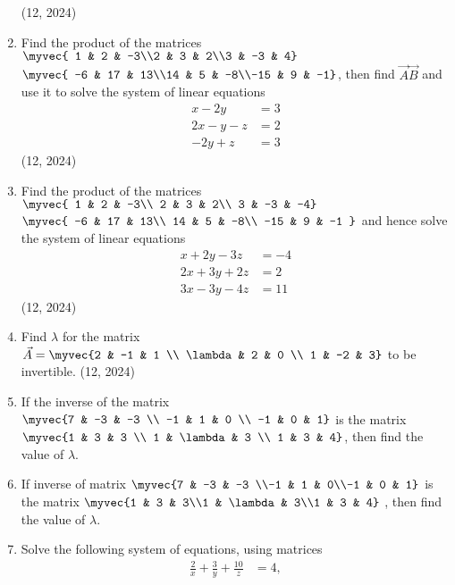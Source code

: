 \begin{enumerate}[label=\thesubsection.\arabic*,ref=\thesubsection.\theenumi]
\hfill (12, 2024)
\item Find the product of the matrices $\myvec{ 1 & 2 & -3\\2 & 3 & 2\\3 & -3 & 4}$ $\myvec{  -6 & 17 & 13\\14 & 5 & -8\\-15 & 9 & -1}$, then find $\vec{A}\vec{B}$ and use it to solve the system of linear equations 
\begin{align*} x - 2y &= 3\\2x - y - z &= 2\\-2y + z &= 3\end{align*}
\hfill (12, 2024)
%
\item Find the product of the matrices $\myvec{
    1 & 2 & -3\\
    2 & 3 & 2\\
    3 & -3 & -4}$
$\myvec{
    -6 & 17 & 13\\
    14 & 5 & -8\\
    -15 & 9 & -1
}$ and hence solve the system of linear equations
\begin{align*}
x +2y-3z&=-4\\
2x+3y+2z&=2\\
3x-3y-4z&=11
\end{align*}
%
\hfill (12, 2024)
\item Find $\lambda$ for the matrix $\vec{A} = \myvec{2 & -1 & 1 \\ \lambda & 2 & 0 \\ 1 & -2 & 3}$ to be invertible. 
\hfill (12, 2024)
     \item If the inverse of the matrix $\myvec{7 & -3 & -3 \\ -1 & 1 & 0 \\ -1 & 0 & 1}$ is the matrix $\myvec{1 & 3 & 3 \\ 1 & \lambda & 3 \\ 1 & 3 & 4}$, then find the value of $\lambda$. 
	\item If inverse of matrix $\myvec{7 & -3 & -3 \\-1 & 1 & 0\\-1 & 0 & 1}$ is the matrix $\myvec{1 & 3 & 3\\1 & \lambda & 3\\1 & 3 & 4}$ , then find the value of $\lambda$. 
	\item Solve the following system of equations, using matrices
\begin{align*}
	\frac{2}{x} + \frac{3}{y} + \frac{10}{z}  &= 4, 
		\\

\end{align*}
\end{enumerate}
